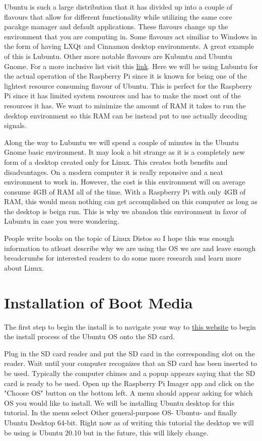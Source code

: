 \documentclass[letterpaper,12pt,notitlepage]{report} %
\begin{document}
Ubuntu is such a large distribution that it has divided up into a couple of flavours that allow for different functionality while utilizing the same core pacakge manager and default applications. These flavours change up the environment that you are computing in. Some flavours act similiar to Windows in the form of having LXQt and Cinnamon desktop environments. A great example of this is Lubuntu. Other more notable flavours are Kubuntu and Ubuntu Gnome. For a more inclusive list visit this \href{https://ubuntu.com/download/flavours}{link}. Here we will be using Lubuntu for the actual operation of the Raspberry Pi since it is known for being one of the lightest resource consuming flavour of Ubuntu. This is perfect for the Raspberry Pi since it has limited system resources and has to make the most out of the resources it has. We want to minimize the amount of RAM it takes to run the desktop environment so this RAM can be instead put to use actually decoding signals. 

Along the way to Lubuntu we will spend a couple of minutes in the Ubuntu Gnome basic environment. It may look a bit strange as it is a completely new form of a desktop created only for Linux. This creates both benefits and disadvantages. On a modern computer it is really reponsive and a neat environment to work in. However, the cost is this environment will on average consume 4GB of RAM all of the time. With a Raspberry Pi with only 4GB of RAM, this would mean nothing can get accomplished on this computer as long as the desktop is beign run. This is why we abandon this environment in favor of Lubuntu in case you were wondering. 

People write books on the topic of Linux Distos so I hope this was enough information to atleast describe why we are using the OS we are and leave enough breadcrumbs for interested readers to do some more research and learn more about Linux. 

\section{Installation of Boot Media}

The first step to begin the install is to navigate your way to \href{https://www.raspberrypi.org/software/}{this website} to begin the install process of the Ubuntu OS onto the SD card.

Plug in the SD card reader and put the SD card in the corresponding slot on the reader. Wait until your computer recognizes that an SD card has been inserted to be used. Typically the computer chimes and a popup appears saying that the SD card is ready to be used. Open up the Raspberry Pi Imager app and click on the "Choose OS" button on the bottom left. A menu should appear asking for which OS you would like to install. We will be installing Ubuntu desktop for this tutorial. In the menu select Other general-purpose OS- Ubuntu- and finally Ubuntu Desktop 64-bit. Right now as of writing this tutorial the desktop we will be using is Ubuntu 20.10 but in the future, this will likely change.
\end{document}
